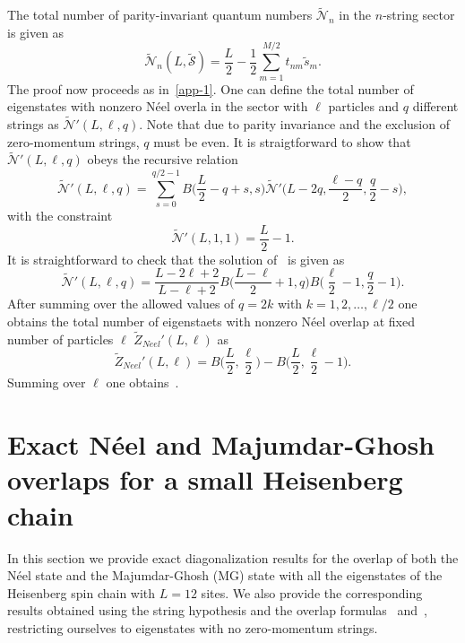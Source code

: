 \documentclass[11pt]{iopart}
\begin{document}
The total number of parity-invariant quantum numbers $\widetilde{\mathcal N}_n$ in the $n$-string 
sector is given as  
%
\begin{equation}
\widetilde{\mathcal N}_n(L,\widetilde{\mathcal S})=\frac{L}{2}-\frac{1}{2}
\sum_{m=1}^{M/2}t_{nm}\tilde s_m.
\end{equation}
%
The proof now proceeds as in~\ref{app-1}. One can define the total number of eigenstates 
with nonzero N\'eel overla in the sector with $\ell$ particles and $q$ different strings as 
$\widetilde{\mathcal N}'(L,\ell,q)$. Note that due to parity invariance and the exclusion of 
zero-momentum strings, $q$ must be even. It is straigtforward to show that $\widetilde
{\mathcal N}'(L,\ell,q)$ obeys the recursive relation
%
\begin{equation}
\label{NpLlq-1}
\widetilde{\mathcal N}'(L,\ell,q)=\sum_{s=0}^{q/2-1}B\Big(\frac{L}{2}-q+s,s\Big)\widetilde
{\mathcal N}'\Big(L-2q,\frac{\ell-q}{2},\frac{q}{2}-s\Big),
\end{equation}
% 
with the constraint
%
\begin{equation}
\widetilde{\mathcal N}'(L,1,1)=\frac{L}{2}-1. 
\end{equation}
%
It is straightforward to check that the solution of~ is given as 
%
\begin{equation}
\widetilde{\mathcal N}'(L,\ell,q)=\frac{L-2\ell+2}{L-\ell+2}B\Big(\frac{L-\ell}{2}+1,q\Big)
B\Big(\frac{\ell}{2}-1,\frac{q}{2}-1\Big).
\end{equation}
%
After summing over the allowed values of $q=2k$ with $k=1,2,\dots,\ell/2$ one obtains 
the total number of eigenstaets with nonzero N\'eel overlap at fixed number of 
particles $\ell$ $\widetilde Z_{Neel}'(L,\ell)$ as 
%
\begin{equation}
\widetilde Z_{Neel}'(L,\ell)=B\Big(\frac{L}{2},\frac{\ell}{2}\Big)-
B\Big(\frac{L}{2},\frac{\ell}{2}-1\Big).
\end{equation}
%
Summing over $\ell$ one obtains~.


\section{Exact N\'eel and Majumdar-Ghosh overlaps for a small Heisenberg chain} 
\label{app-L12}

In this section we provide exact diagonalization results for the overlap of both the 
N\'eel state and the Majumdar-Ghosh (MG) state with all the eigenstates of the Heisenberg 
spin chain with $L=12$ sites. We also provide the corresponding results obtained 
using the string hypothesis and the overlap formulas~ and~, 
restricting ourselves to eigenstates with no zero-momentum strings. 
\end{document}
